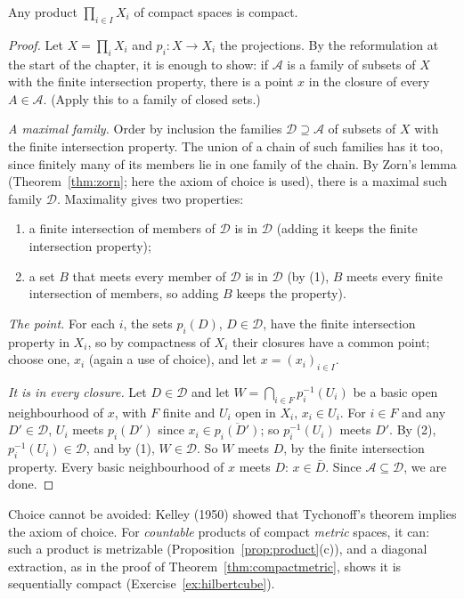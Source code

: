 \begin{theorem}[Tychonoff, 1930]\label{thm:tychonoff}
Any product $\prod_{i\in I}X_i$ of compact spaces is compact.
\end{theorem}
\begin{proof}
Let $X=\prod_iX_i$ and $p_i:X\to X_i$ the projections. By the reformulation at the start of the chapter, it is enough to show: if $\mathcal A$ is a family of subsets
of $X$ with the finite intersection property, there is a point $x$ in the closure of every $A\in\mathcal A$. (Apply this to a family of closed sets.)

\emph{A maximal family.} Order by inclusion the families $\mathcal D\supseteq\mathcal A$ of subsets of $X$ with the finite intersection property. The union of a chain of such
families has it too, since finitely many of its members lie in one family of the chain. By Zorn's lemma (Theorem~\ref{thm:zorn}; here the axiom of
choice is used), there is a maximal such family $\mathcal D$. Maximality gives two properties:
\begin{enumerate}[label=(\arabic*)]
\item a finite intersection of members of $\mathcal D$ is in $\mathcal D$ (adding it keeps the finite intersection property);
\item a set $B$ that meets every member of $\mathcal D$ is in $\mathcal D$ (by (1), $B$ meets every finite intersection of members, so adding $B$ keeps the property).
\end{enumerate}

\emph{The point.} For each $i$, the sets $p_i(D)$, $D\in\mathcal D$, have the finite intersection property in $X_i$, so by compactness of $X_i$ their closures have a common
point; choose one, $x_i$ (again a use of choice), and let $x=(x_i)_{i\in I}$.

\emph{It is in every closure.} Let $D\in\mathcal D$ and let $W=\bigcap_{i\in F}p_i^{-1}(U_i)$ be a basic open neighbourhood of $x$, with $F$ finite and $U_i$ open in $X_i$, $x_i\in U_i$.
For $i\in F$ and any $D'\in\mathcal D$, $U_i$ meets $p_i(D')$ since $x_i\in\overline{p_i(D')}$; so $p_i^{-1}(U_i)$ meets $D'$. By (2), $p_i^{-1}(U_i)\in\mathcal D$, and by (1), $W\in\mathcal D$. So $W$
meets $D$, by the finite intersection property. Every basic neighbourhood of $x$ meets $D$: $x\in\bar D$. Since $\mathcal A\subseteq\mathcal D$, we are done.
\end{proof}

\begin{remark}
Choice cannot be avoided: Kelley (1950) showed that Tychonoff's theorem implies the axiom of choice. For \emph{countable} products of compact
\emph{metric} spaces, it can: such a product is metrizable (Proposition~\ref{prop:product}(c)), and a diagonal extraction, as in the proof of
Theorem~\ref{thm:compactmetric}, shows it is sequentially compact (Exercise~\ref{ex:hilbertcube}).
\end{remark}

